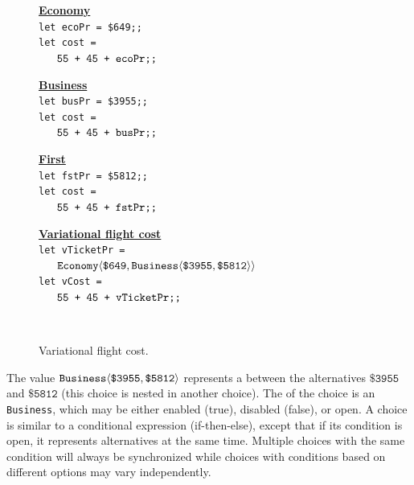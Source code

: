 \begin{figure}[h]
    \centering
\begin{minipage}[t]{0.49\textwidth}
\textbf{\underline{Economy}} \\
\texttt{let ecoPr =  \$649;;}\\ 
\texttt{let cost = }\\
$\texttt{ \quad 55 + 45 + ecoPr;;} \\$
\end{minipage}
\begin{minipage}[t]{0.49\textwidth}
\textbf{\underline{Business}} \\
\texttt{let busPr =  \$3955;;}\\
\texttt{let cost = }\\
$\texttt{ \quad 55 + 45 + busPr;;} \\$

\end{minipage}
\hfill

\begin{minipage}[t]{0.49\textwidth}
\textbf{\underline{First}} \\
\texttt{let fstPr =  \$5812;;}\\
\texttt{let cost = }\\
$\texttt{ \quad 55 + 45 + fstPr;;} \\$

\end{minipage}
\begin{minipage}[t]{0.49\textwidth}
\textbf{\underline{Variational flight cost}} \\
\texttt{let vTicketPr = }\\ 
$\texttt{ \quad \Chc[\texttt{Economy}]{\texttt{\$649}}{\Chc[\texttt{Business}]{\texttt{\$3955}}{\texttt{\$5812}}}}$\\
\texttt{let vCost = }\\
$\texttt{ \quad 55 + 45 + vTicketPr;;} \\$
\end{minipage}\\

\caption{Variational flight cost.}
  \label{fig:vp_eg}
\end{figure}
%
 The value $\Chc[\texttt{Business}]{\texttt{\$3955}}{\texttt{\$5812}}$ represents a  between the alternatives $\texttt{\$3955}$ and $\texttt{\$5812}$ (this choice is nested in another choice). The  of the choice is an  \texttt{Business}, which may be either enabled (true), disabled (false), or open. A choice is similar to a conditional expression (if-then-else), except that if its condition is open, it represents  alternatives at the same time. Multiple choices with the same condition will always be synchronized while choices with conditions based on different options may vary independently. 
 
